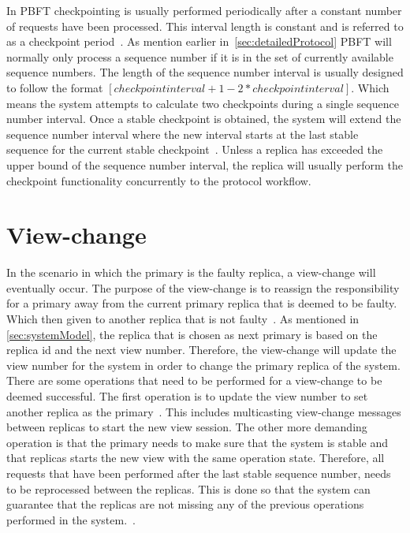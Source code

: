In PBFT checkpointing is usually performed periodically after a constant number of requests have been processed. This interval length is constant and is referred to as a checkpoint period~\cites[p.~261]{BOOK:BuildDepDistSyst}[p.~410]{PAPER:PBFTRecovery}. As mention earlier in~\autoref{sec:detailedProtocol} PBFT will normally only process a sequence number if it is in the set of currently available sequence numbers. The length of the sequence number interval is usually designed to follow the format $[checkpointinterval+1-2*checkpointinterval]$. Which means the system attempts to calculate two checkpoints during a single sequence number interval. Once a stable checkpoint is obtained, the system will extend the sequence number interval where the new interval starts at the last stable sequence for the current stable checkpoint~\cites[p.~5]{PAPER:OGPBFT}[p.~410]{PAPER:PBFTRecovery}. Unless a replica has exceeded the upper bound of the sequence number interval, the replica will usually perform the checkpoint functionality concurrently to the protocol workflow.

\section{View-change}
\label{sec:view-change}
In the scenario in which the primary is the faulty replica, a view-change will eventually occur. The purpose of the view-change is to reassign the responsibility for a primary away from the current primary replica that is deemed to be faulty. Which then given to another replica that is not faulty~\cites[p.262]{BOOK:BuildDepDistSyst}. As mentioned in \autoref{sec:systemModel}, the replica that is chosen as next primary is based on the replica id and the next view number. Therefore, the view-change will update the view number for the system in order to change the primary replica of the system. There are some operations that need to be performed for a view-change to be deemed successful. The first operation is to update the view number to set another replica as the primary~\cites[p.~6]{PAPER:OGPBFT}[p.~411]{PAPER:PBFTRecovery}{WEB:SawtoothPBFT}. This includes multicasting view-change messages between replicas to start the new view session. The other more demanding operation is that the primary needs to make sure that the system is stable and that replicas starts the new view with the same operation state. Therefore, all requests that have been performed after the last stable sequence number, needs to be reprocessed between the replicas. This is done so that the system can guarantee that the replicas are not missing any of the previous operations performed in the system.~\cites[p.~458]{BOOK:MVstandver3}[p.~263-265]{BOOK:BuildDepDistSyst}. 

